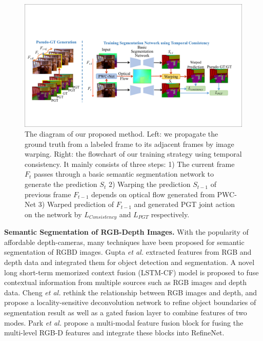 \begin{figure}[htbp]
	\setlength{\abovecaptionskip}{0pt} 
	\setlength{\belowcaptionskip}{10pt}
	\centering
	\centering
	\includegraphics[scale=0.56]{figure/Pipeline.pdf}
	\caption{The diagram of our proposed method. Left: we propagate the ground truth from a labeled frame to its adjacent frames by image warping. Right: the flowchart of our training strategy using temporal consistency. 
	It mainly consists of three steps: 1) The current frame $F_t$ passes through a basic semantic segmentation network to generate the prediction $S_{t}$ 2) Warping the prediction $S_{t-1}$ of previous frame $F_{t-1}$ depends on optical flow generated from PWC-Net \cite{Sun2018} 3) Warped prediction of $F_{t-1}$ and generated PGT joint action on the network by $L_{Consistency}$ and $L_{PGT}$ respectively.
		}
	\label{fig:Pipeline}
	\vspace*{-0.2cm}
\end{figure}
 

\noindent \textbf{Semantic Segmentation of RGB-Depth Images.}
%
With the popularity of affordable depth-cameras, many techniques have been proposed for semantic segmentation of RGBD images.
%
Gupta \emph{et al.} \cite{Gupta2014} extracted features from RGB and depth data and integrated them for object detection and segmentation.
%
A novel long short-term memorized context fusion (LSTM-CF) model is proposed \cite{Li2016} to fuse contextual information from multiple sources such as RGB images and depth data.
% 
Cheng \emph{et al.} \cite{Cheng2017} rethink the relationship between RGB images and depth, and propose a locality-sensitive deconvolution network to refine object boundaries of segmentation result as well as a gated fusion layer to combine features of two modes.
%
Park \emph{et al.} \cite{Park2017} propose a multi-modal feature fusion block for fusing the multi-level RGB-D features and integrate these blocks into RefineNet.


